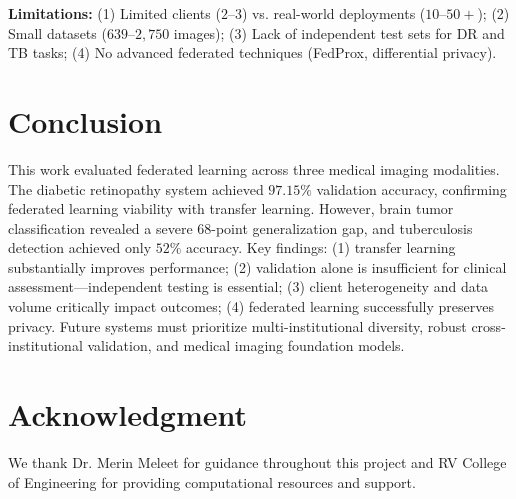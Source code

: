 \documentclass[conference]{IEEEtran}
\begin{document}
\textbf{Limitations:} (1) Limited clients ($2$--$3$) vs. real-world deployments ($10$--$50+$); (2) Small datasets ($639$--$2,750$ images); (3) Lack of independent test sets for DR and TB tasks; (4) No advanced federated techniques (FedProx, differential privacy).

\section{Conclusion}
This work evaluated federated learning across three medical imaging modalities. The diabetic retinopathy system achieved $97.15\%$ validation accuracy, confirming federated learning viability with transfer learning. However, brain tumor classification revealed a severe 68-point generalization gap, and tuberculosis detection achieved only $52\%$ accuracy. Key findings: (1) transfer learning substantially improves performance; (2) validation alone is insufficient for clinical assessment---independent testing is essential; (3) client heterogeneity and data volume critically impact outcomes; (4) federated learning successfully preserves privacy. Future systems must prioritize multi-institutional diversity, robust cross-institutional validation, and medical imaging foundation models.

\section*{Acknowledgment}
We thank Dr. Merin Meleet for guidance throughout this project and RV College of Engineering for providing computational resources and support.
\end{document}
